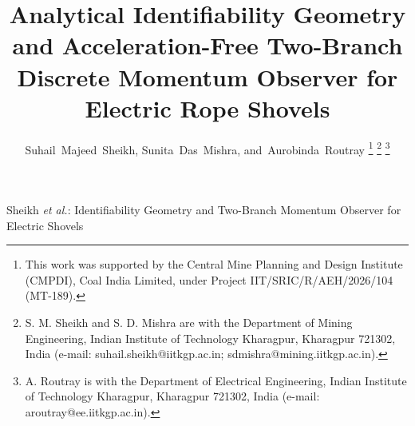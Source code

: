 \documentclass[journal]{IEEEtran}
\begin{document}
\title{Analytical Identifiability Geometry and Acceleration-Free Two-Branch Discrete Momentum Observer for Electric Rope Shovels}

\author{Suhail~Majeed~Sheikh,
        Sunita~Das~Mishra,
        and~Aurobinda~Routray%
\thanks{This work was supported by the Central Mine Planning and Design Institute (CMPDI), Coal India Limited, under Project IIT/SRIC/R/AEH/2026/104 (MT-189).}
\thanks{S. M. Sheikh and S. D. Mishra are with the Department of Mining Engineering, Indian Institute of Technology Kharagpur, Kharagpur 721302, India (e-mail: suhail.sheikh@iitkgp.ac.in; sdmishra@mining.iitkgp.ac.in).}
\thanks{A. Routray is with the Department of Electrical Engineering, Indian Institute of Technology Kharagpur, Kharagpur 721302, India (e-mail: aroutray@ee.iitkgp.ac.in).}
}

%
{Sheikh \MakeLowercase{\textit{et al.}}: Identifiability Geometry and Two-Branch Momentum Observer for Electric Shovels}

\maketitle
\end{document}
